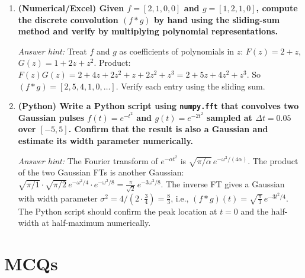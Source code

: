 \documentclass[12pt,a4paper]{article}
\begin{document}
\begin{enumerate}[label=\textbf{P\arabic*.}, leftmargin=*, itemsep=8pt]
\item \textbf{(Numerical/Excel) Given $f=[2,1,0,0]$ and $g=[1,2,1,0]$, compute the
  discrete convolution $(f*g)$ by hand using the sliding-sum method and verify by
  multiplying polynomial representations.}

  \textit{Answer hint:} Treat $f$ and $g$ as coefficients of polynomials in $z$:
  $F(z)=2+z$, $G(z)=1+2z+z^2$.
  Product: $F(z)G(z) = 2+4z+2z^2+z+2z^2+z^3 = 2+5z+4z^2+z^3$.
  So $(f*g) = [2,5,4,1,0,\ldots]$. Verify each entry using the sliding sum.

\item \textbf{(Python) Write a Python script using \texttt{numpy.fft} that convolves two
  Gaussian pulses $f(t) = e^{-t^2}$ and $g(t)=e^{-2t^2}$ sampled at $\Delta t = 0.05$
  over $[-5,5]$. Confirm that the result is also a Gaussian and estimate its
  width parameter numerically.}

  \textit{Answer hint:} The Fourier transform of $e^{-\alpha t^2}$ is
  $\sqrt{\pi/\alpha}\,e^{-\omega^2/(4\alpha)}$. The product of the two Gaussian
  FTs is another Gaussian: $\sqrt{\pi/1}\cdot\sqrt{\pi/2}\,e^{-\omega^2/4}
  \cdot e^{-\omega^2/8} = \frac{\pi}{\sqrt{2}}\,e^{-3\omega^2/8}$.
  The inverse FT gives a Gaussian with width parameter $\sigma^2 = 4/(2\cdot
  \frac{3}{4}) = \frac{8}{3}$, i.e., $(f*g)(t) = \sqrt{\frac{\pi}{3}}\,e^{-3t^2/4}$.
  The Python script should confirm the peak location at $t=0$ and the half-width
  at half-maximum numerically.

\end{enumerate}

\section{MCQs}
\end{document}
